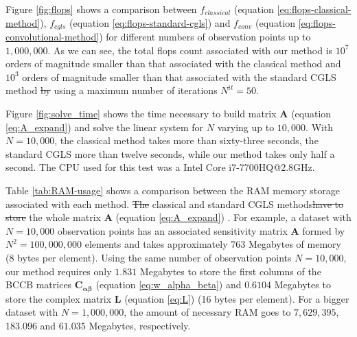 \documentclass[manuscript]{geophysics}
\providecommand{\DIFaddtex}[1]{{\protect\color{blue}\uwave{#1}}} %
\providecommand{\DIFdeltex}[1]{{\protect\color{red}\sout{#1}}}                      %
\providecommand{\DIFaddbegin}{} %
\providecommand{\DIFaddend}{} %
\providecommand{\DIFdelbegin}{} %
\providecommand{\DIFdelend}{} %
\providecommand{\DIFadd}[1]{\texorpdfstring{\DIFaddtex{#1}}{#1}} %
\providecommand{\DIFdel}[1]{\texorpdfstring{\DIFdeltex{#1}}{}} %
\begin{document}
	Figure \ref{fig:flops} shows a comparison between 
	$f_{classical}$ (equation \ref{eq:flops-classical-method}), 
	$f_{cgls}$ (equation \ref{eq:flops-standard-cgls}) and 
	$f_{conv}$ (equation \ref{eq:flops-convolutional-method})
	for different numbers of observation points up to $1,000,000$. As we can see, 
	the total flops count associated with our method is \DIFdelbegin \DIFdel{$10^7$ }\DIFdelend \DIFaddbegin \DIFadd{$7$ }\DIFaddend orders of magnitude smaller 
	than that associated with the classical method and \DIFdelbegin \DIFdel{$10^3$ }\DIFdelend \DIFaddbegin \DIFadd{$3$ }\DIFaddend orders of magnitude smaller than
	that associated with the standard CGLS method \DIFdelbegin \DIFdel{by }\DIFdelend \DIFaddbegin \DIFadd{when }\DIFaddend using a maximum number
	of iterations $N^{it} = 50$. 
	
	Figure \ref{fig:solve_time} shows the time necessary to build matrix $\mathbf{A}$ 
	(equation \ref{eq:A_expand}) and solve the linear system for $N$ varying up to $10,000$. 
	With $N = 10,000$, the classical method takes more than sixty-three seconds, the standard 
	CGLS more than twelve seconds, while our method takes only half a second. 
	The CPU used for this test was a Intel Core i7-7700HQ@2.8GHz.
	
	
	Table \ref{tab:RAM-usage} shows a comparison between the RAM memory storage 
	associated with each method. \DIFdelbegin \DIFdel{The }\DIFdelend \DIFaddbegin \DIFadd{In the }\DIFaddend classical and standard CGLS methods\DIFdelbegin \DIFdel{have to store }\DIFdelend \DIFaddbegin \DIFadd{, }\DIFaddend the whole 
	matrix $\mathbf{A}$ (equation \ref{eq:A_expand}) \DIFaddbegin \DIFadd{has to be stored}\DIFaddend . For example, a dataset with 
	$N = 10,000$ observation points has an associated sensitivity matrix $\mathbf{A}$ formed by 
	$N^2 = 100,000,000$ elements and takes approximately $763$ Megabytes of memory (8 bytes per element). 
	Using the same number of observation points $N = 10,000$, our method requires only 
	$1.831$ Megabytes to store the first columns of the BCCB matrices
	$\mathbf{C}_{\boldsymbol{\alpha\beta}}$ (equation \ref{eq:w_alpha_beta}) and 
	$0.6104$ Megabytes to store the complex matrix $\mathbf{L}$ (equation \ref{eq:L}) 
	(16 bytes per element). For a bigger dataset with $N = 1,000,000$, the amount of necessary RAM 
	goes to $7,629,395$, $183.096$ and $61.035$ Megabytes, respectively.
	
\end{document}
